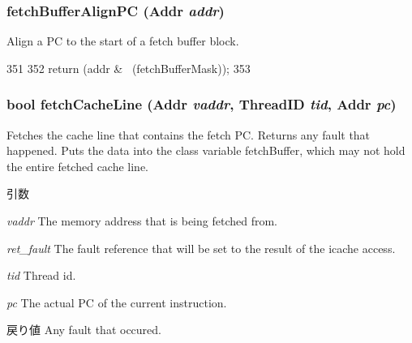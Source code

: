 \hypertarget{classDefaultFetch_a0c451948a0050595e5d23f57866f2797}{
\subsubsection[{fetchBufferAlignPC}]{ fetchBufferAlignPC ({\bf Addr} {\em addr})}}
\label{classDefaultFetch_a0c451948a0050595e5d23f57866f2797}
Align a PC to the start of a fetch buffer block. 


\begin{DoxyCode}
351     {
352         return (addr & ~(fetchBufferMask));
353     }
\end{DoxyCode}
\hypertarget{classDefaultFetch_a2ede53ea19a95876fd2418fcc329ef9a}{
\subsubsection[{fetchCacheLine}]{\setlength{\rightskip}{0pt plus 5cm}bool fetchCacheLine ({\bf Addr} {\em vaddr}, \/  {\bf ThreadID} {\em tid}, \/  {\bf Addr} {\em pc})}}
\label{classDefaultFetch_a2ede53ea19a95876fd2418fcc329ef9a}
Fetches the cache line that contains the fetch PC. Returns any fault that happened. Puts the data into the class variable fetchBuffer, which may not hold the entire fetched cache line. 
\begin{DoxyParams}{引数}
\item[{\em vaddr}]The memory address that is being fetched from. \item[{\em ret\_\-fault}]The fault reference that will be set to the result of the icache access. \item[{\em tid}]Thread id. \item[{\em pc}]The actual PC of the current instruction. \end{DoxyParams}
\begin{DoxyReturn}{戻り値}
Any fault that occured. 
\end{DoxyReturn}



